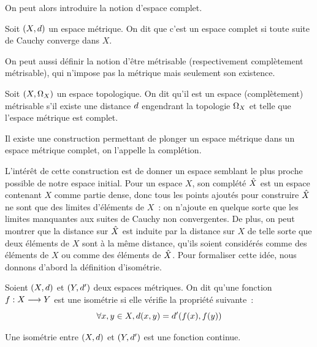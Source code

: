 \noindent
On peut alors introduire la notion d'espace complet.

\begin{definition}
  Soit $(X,d)$ un espace métrique. On dit que c'est un espace complet si
  toute suite de Cauchy converge dans $X$.
\end{definition}

On peut aussi définir la notion d'être métrisable (respectivement complètement
métrisable), qui n'impose pas la métrique mais seulement son existence.

\begin{definition}
  Soit $(X,\Omega_{X})$ un espace topologique. On dit qu'il est un espace
  (complètement) métrisable s'il existe une distance $d$ engendrant la
  topologie $\Omega_{X}$ et telle que l'espace métrique est complet.
\end{definition}

Il existe une construction permettant de plonger un espace métrique dans un
espace métrique complet, on l'appelle la complétion.

L'intérêt de cette construction est de donner un espace semblant le plus proche
possible de notre espace initial. Pour un espace $X$, son complété $\hat{X}$
est un espace contenant $X$ comme partie dense, donc tous les points ajoutés
pour construire $\hat{X}$ ne sont que des limites d'éléments de $X$~: on
n'ajoute en quelque sorte que les limites manquantes aux suites de Cauchy non
convergentes. De plus, on peut montrer que la distance sur $\hat{X}$ est
induite par la distance sur $X$ de telle sorte que deux éléments de $X$ sont à
la même distance, qu'ils soient considérés comme des éléments de $X$ ou comme
des éléments de $\hat{X}$. Pour formaliser cette idée, nous donnons d'abord la
définition d'isométrie.

\begin{definition}[Isométrie]
  Soient $(X,d)$ et $(Y,d')$ deux espaces métriques. On dit qu'une
  fonction $f : \displaystyle X \longrightarrow Y$ est une isométrie si elle vérifie la
  propriété suivante~:
  \[\forall x,y \in X, d(x,y) = d'(f(x),f(y))\]
\end{definition}

\begin{property}
  Une isométrie entre $(X,d)$ et $(Y,d')$ est une fonction continue.
\end{property}


